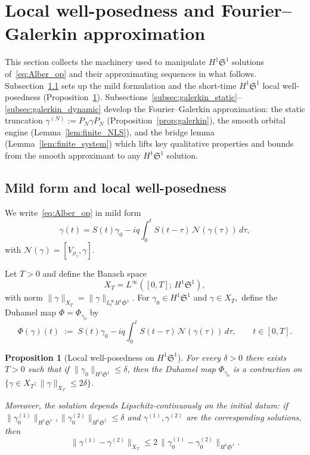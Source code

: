 \documentclass[11pt]{amsart}
\newtheorem{proposition}[theorem]{Proposition}
\theoremstyle{definition}
\newcommand{\Sp}{\mathfrak{S}}
\begin{document}
\section{Local well-posedness and Fourier--Galerkin approximation}
\label{sec:galerkin}

This section collects the machinery used to manipulate $H^1\Sp^1$ solutions of~\eqref{eq:Alber_op} and their approximating sequences in what follows. Subsection~\ref{subsec:lwp} sets up the mild formulation and the short-time $H^1\Sp^1$ local well-posedness (Proposition~\ref{prop:local}). Subsections~\ref{subsec:galerkin_static}--\ref{subsec:galerkin_dynamic} develop the Fourier--Galerkin approximation: the static truncation $\gamma^{(N)}:=P_N\gamma P_N$ (Proposition~\ref{prop:galerkin}), the smooth orbital engine (Lemma~\ref{lem:finite_NLS}), and the bridge lemma (Lemma~\ref{lem:finite_system}) which lifts key qualitative properties and bounds from the smooth approximant to any $H^1\Sp^1$ solution.

\subsection{Mild form and local well-posedness}
\label{subsec:lwp}


We write~\eqref{eq:Alber_op} in mild form
\begin{equation}\label{eq:Duhamel}
  \gamma(t) = S(t)\gamma_0
  - iq\int_0^t S(t-\tau)\,
  \mathcal{N}(\gamma(\tau))\,d\tau,
\end{equation}
with $\mathcal{N}(\gamma)=[V_{\rho_\gamma},\gamma]$.

\medskip

Let $T>0$ and define the Banach space
\begin{equation}\label{eq:XT}
  X_T = L^\infty([0,T];\,H^1\Sp^1),
\end{equation}
with norm $\|\gamma\|_{X_T} = \|\gamma\|_{L^\infty_t H^1\Sp^1}$. For $\gamma_0\in H^1\Sp^1$ and $\gamma\in X_T,$ define the Duhamel map $\Phi=\Phi_{\gamma_0}$ by
\begin{equation}\label{eq:Duhamel_map}
  \Phi(\gamma)(t) \;:=\; S(t)\gamma_0
  - iq\int_0^t S(t-\tau)\,\mathcal{N}(\gamma(\tau))\,d\tau,
  \qquad t\in[0,T].
\end{equation}

\begin{proposition}[Local well-posedness on $H^1\Sp^1$]
\label{prop:local}
For every $\delta>0$ there exists $T>0$ such that if $\|\gamma_0\|_{H^1\Sp^1}\le\delta$, then the Duhamel map $\Phi_{\gamma_0}$ is a contraction on $\bigl\{\gamma\in X_T : \|\gamma\|_{X_T}\le 2\delta\bigr\}$.

Moreover, the solution depends Lipschitz-continuously on the initial datum: if $\|\gamma_0^{(1)}\|_{H^1\Sp^1}, \|\gamma_0^{(2)}\|_{H^1\Sp^1}\le\delta$ and $\gamma^{(1)},\gamma^{(2)}$ are the corresponding solutions, then
\begin{equation}\label{eq:lwp_stab}
  \|\gamma^{(1)}-\gamma^{(2)}\|_{X_T}
  \le 2\,\|\gamma_0^{(1)}-\gamma_0^{(2)}\|_{H^1\Sp^1}.
\end{equation}
\end{proposition}
\end{document}
